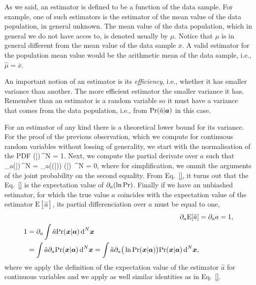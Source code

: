 As we said, an estimator is defined to be a function of the data sample.
For example, one of such estimators is the estimator of the mean value of the data population, in general unknown.
The mean value of the data population, which in general we do not have acces to, is denoted usually by $\mu$.
Notice that $\mu$ is in general different from the mean value of the data sample $\overline{x}$.
A valid estimator for the population mean value would be the arithmetic mean of the data sample, i.e., $\hat{\mu}=\overline{x}$.

An important notion of an estimator is its \emph{efficiency}, i.e., whether it has smaller variance than another.
The more efficient estimator the smaller variance it has.
Remember than an estimator is a random variable so it must have a variance that comes from the data population, i.e., from $\text{Pr}(\hat{a}|\boldsymbol{a})$ in this case.

For an estimator of any kind there is a theoretical lower bound for its variance.
For the proof of the previous observation, which we compute for continuous random variables without lossing of generality, we start with the normalisation of the PDF
\be
  \int \prob(|)\,^N = 1.
\ee
Next, we compute the partial derivate over $a$ such that
\be
  \int \partial_a\prob(|)\,^N = \int \partial_a\big(\ln  \prob(|)\big) \prob(|) \,^N = 0,
\ee
where for simplification, we ommit the arguments of the joint probability on the second equality.
From Eq.~\eqref{}, it turns out that the Eq.~\eqref{} is the expectation value of $\partial_a(\ln\text{Pr})$.
Finally if we have an unbiashed estimator, for which the true value $a$ coincides with the expectation value of the estimator $\text{E}[\hat{a}]$, its partial differenciation over $a$ must be equal to one,
\begin{align}
  \partial_a\text{E}[\hat{a}] &= \partial_a a = 1, \\
  \begin{split}
    1 &= \partial_a \int \hat{a} \text{Pr}(\boldsymbol{x}|\boldsymbol{a})\,\text{d}^N\boldsymbol{x} \\
      &=  \int \hat{a} \partial_a\text{Pr}(\boldsymbol{x}|\boldsymbol{a})\,\text{d}^N\boldsymbol{x} =  \int \hat{a} \partial_a\big(\ln  \text{Pr}(\boldsymbol{x}|\boldsymbol{a})\big) \text{Pr}(\boldsymbol{x}|\boldsymbol{a}) \,\text{d}^N\boldsymbol{x},
  \end{split}
\end{align}
where we apply the definition of the expectation value of the estimator $\hat{a}$ for continuous variables and we apply as well similar identities as in Eq.~\eqref{}.

